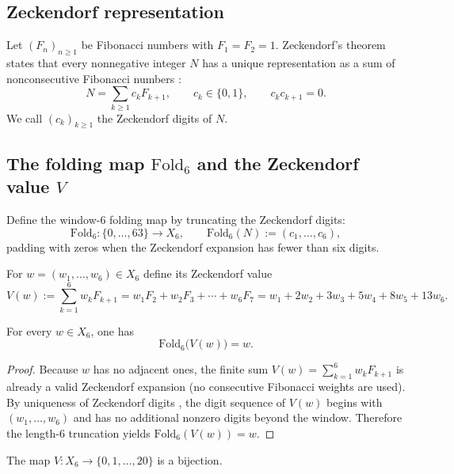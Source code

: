 \subsection{Zeckendorf representation}
\label{sec:zeckendorf}

Let $(F_n)_{n\ge 1}$ be Fibonacci numbers with $F_1=F_2=1$.
Zeckendorf's theorem states that every nonnegative integer $N$ has a unique representation as a sum of nonconsecutive Fibonacci numbers \cite{Zeckendorf1972}:
\[
N=\sum_{k\ge 1} c_k F_{k+1},\qquad c_k\in\{0,1\},\qquad c_k c_{k+1}=0.
\]
We call $(c_k)_{k\ge 1}$ the Zeckendorf digits of $N$.

\subsection{The folding map \texorpdfstring{$\mathrm{Fold}_6$}{Fold6} and the Zeckendorf value \texorpdfstring{$V$}{V}}
\label{sec:fold6}

Define the window-$6$ folding map by truncating the Zeckendorf digits:
\[
\mathrm{Fold}_6:\{0,\dots,63\}\to X_6,\qquad
\mathrm{Fold}_6(N):=(c_1,\dots,c_6),
\]
padding with zeros when the Zeckendorf expansion has fewer than six digits.

For $w=(w_1,\dots,w_6)\in X_6$ define its Zeckendorf value
\[
V(w):=\sum_{k=1}^6 w_k F_{k+1} = w_1 F_2 + w_2 F_3 + \cdots + w_6 F_7
 = w_1 + 2 w_2 + 3 w_3 + 5 w_4 + 8 w_5 + 13 w_6.
\]

\begin{lemma}
\label{lem:fold6_of_V_is_identity}
For every $w\in X_6$, one has
\[
\mathrm{Fold}_6\bigl(V(w)\bigr)=w.
\]
\end{lemma}

\begin{proof}
Because $w$ has no adjacent ones, the finite sum $V(w)=\sum_{k=1}^6 w_k F_{k+1}$ is already a valid Zeckendorf expansion (no consecutive Fibonacci weights are used).
By uniqueness of Zeckendorf digits \cite{Zeckendorf1972}, the digit sequence of $V(w)$ begins with $(w_1,\dots,w_6)$ and has no additional nonzero digits beyond the window.
Therefore the length-$6$ truncation yields $\mathrm{Fold}_6(V(w))=w$.
\end{proof}

\begin{corollary}
\label{cor:V_bijection_0_20}
The map $V:X_6\to\{0,1,\dots,20\}$ is a bijection.
\end{corollary}

